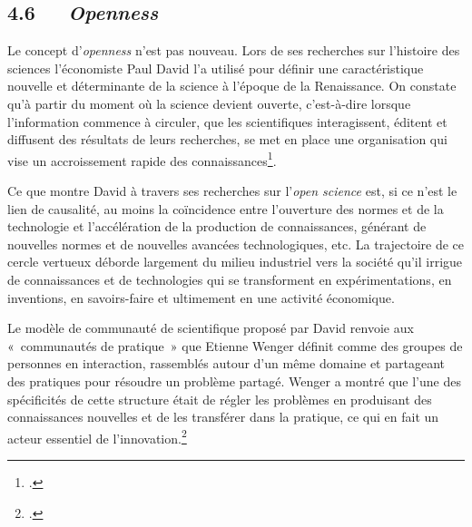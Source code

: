 \documentclass{FramateX}
\begin{document}
\begin{refsection}
\subsection*{4.6~~~\textit{Openness}}
{}

Le concept d'\textit{openness} n'est pas nouveau. Lors de ses recherches
sur l'histoire des sciences l'économiste Paul David l'a utilisé pour
définir une caractéristique nouvelle et déterminante de la science à
l'époque de la Renaissance. On constate qu'à partir du moment où la
science devient ouverte, c'est-à-dire lorsque l'information commence à
circuler, que les scientifiques interagissent, éditent et diffusent des
résultats de leurs recherches, se met en place une organisation qui
vise un accroissement rapide des connaissances\footnote{\cite[p.~15]{davidessay2007}.}.

Ce que montre David à travers ses recherches sur l'\textit{open science}
est, si ce n'est le lien de causalité, au moins la coïncidence entre
l'ouverture des normes et de la technologie et l'accélération de la
production de connaissances, générant de nouvelles normes et de
nouvelles avancées technologiques, etc. La trajectoire de ce cercle
vertueux déborde largement du milieu industriel vers la société qu'il
irrigue de connaissances et de technologies qui se transforment en
expérimentations, en inventions, en savoirs-faire et ultimement en une
activité économique.

Le modèle de communauté de scientifique proposé par David renvoie aux
«~communautés de pratique~» que Etienne Wenger définit comme des
groupes de personnes en interaction, rassemblés autour d'un même
domaine et partageant des pratiques pour résoudre un problème partagé.
Wenger a montré que l'une des spécificités de cette structure était de
régler les problèmes en produisant des connaissances nouvelles et de
les transférer dans la pratique, ce qui en fait un acteur essentiel de
l'innovation.\footnote{\cite{wengercommunities1999}.}


\end{refsection}
\end{document}
